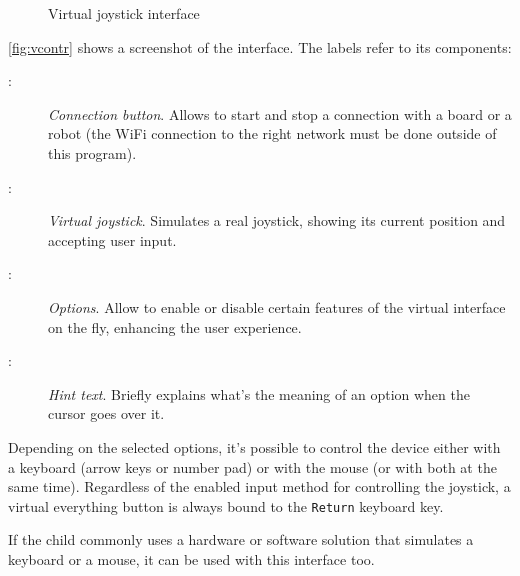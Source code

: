 \begin{figure}[h]
  

  \caption{Virtual joystick interface}
  \label{fig:vcontr}
\end{figure}

\autoref{fig:vcontr} shows a screenshot of the interface. The labels refer to
its components:
\begin{description}
\item[:]
  \textit{Connection button}. Allows to start and stop a connection with a board
  or a robot (the WiFi connection to the right network must be done outside of
  this program).
\item[:]
  \textit{Virtual joystick}. Simulates a real joystick, showing its current
  position and accepting user input.
\item[:]
  \textit{Options}. Allow to enable or disable certain features of the virtual
  interface on the fly, enhancing the user experience.
\item[:]
  \textit{Hint text}. Briefly explains what's the meaning of an option when the
  cursor goes over it.
\end{description}

Depending on the selected options, it's possible to control the device either
with a keyboard (arrow keys or number pad) or with the mouse (or with both at
the same time). Regardless of the enabled input method for controlling the
joystick, a virtual everything button is always bound to the \Verb|Return|
keyboard key.

If the child commonly uses a hardware or software solution
that simulates a keyboard or a mouse, it can be used with this interface too.
